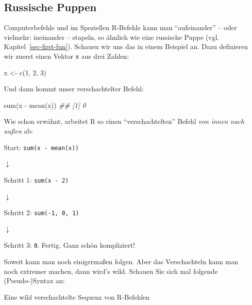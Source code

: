 \documentclass[
  letterpaper,
  twoside,
  open=any]{scrbook}
\newenvironment{Shaded}{\begin{snugshade}}{\end{snugshade}}
\newcommand{\DecValTok}[1]{\textcolor[rgb]{0.68,0.00,0.00}{#1}}
\newcommand{\DocumentationTok}[1]{\textcolor[rgb]{0.37,0.37,0.37}{\textit{#1}}}
\newcommand{\FunctionTok}[1]{\textcolor[rgb]{0.28,0.35,0.67}{#1}}
\newcommand{\NormalTok}[1]{\textcolor[rgb]{0.00,0.23,0.31}{#1}}
\newcommand{\OtherTok}[1]{\textcolor[rgb]{0.00,0.23,0.31}{#1}}
\newcommand{\SpecialCharTok}[1]{\textcolor[rgb]{0.37,0.37,0.37}{#1}}
\theoremstyle{definition}
\theoremstyle{definition}
\theoremstyle{definition}
\theoremstyle{remark}
\begin{document}
\subsection{Russische Puppen}\label{russische-puppen}

Computerbefehle und im Speziellen R-Befehle kann man
\enquote{aufeinander} -- oder vielmehr: ineinander -- stapeln, so
ähnlich wie eine russische Puppe (vgl. Kapitel~\ref{sec-first-fun}).
Schauen wir uns das in einem Beispiel an. Dazu definieren wir zuerst
einen Vektor \texttt{x} aus drei Zahlen:

\begin{Shaded}
\begin{Highlighting}[]
\NormalTok{x }\OtherTok{\textless{}{-}} \FunctionTok{c}\NormalTok{(}\DecValTok{1}\NormalTok{, }\DecValTok{2}\NormalTok{, }\DecValTok{3}\NormalTok{)}
\end{Highlighting}
\end{Shaded}

Und dann kommt unser verschachtelter Befehl:

\begin{Shaded}
\begin{Highlighting}[]
\FunctionTok{sum}\NormalTok{(x }\SpecialCharTok{{-}} \FunctionTok{mean}\NormalTok{(x))}
\DocumentationTok{\#\# [1] 0}
\end{Highlighting}
\end{Shaded}

Wie schon erwähnt, arbeitet R so einen \enquote{verschachtelten} Befehl
\emph{von innen nach außen} ab:

Start: \texttt{sum(x\ -\ mean(x))}

{\(\downarrow\)}

Schritt 1: \texttt{sum(x\ -\ 2)}

{\(\downarrow\)}

Schritt 2: \texttt{sum(-1,\ 0,\ 1)}

{\(\downarrow\)}

Schritt 3: \texttt{0}. Fertig. Ganz schön kompliziert!

Soweit kann man noch einigermaßen folgen. Aber das Verschachteln kann
man noch extremer machen, dann wird's wild. Schauen Sie sich mal
folgende (Pseudo-)Syntax an:

\begin{codelisting}

\caption{\label{lst-schachtel}Eine wild verschachtelte Sequenz von
R-Befehlen}

\centering{

\begin{Shaded}
\begin{Highlighting}[]
\FunctionTok{fasse\_zusammen}\NormalTok{(}
  \FunctionTok{gruppiere}\NormalTok{(}
\NormalTok{    wähle}\FunctionTok{\_spalten}\NormalTok{(}
      \FunctionTok{filter\_zeilen}\NormalTok{(meine\_daten))))}
\end{Highlighting}
\end{Shaded}

}

\end{codelisting}%
\end{document}
